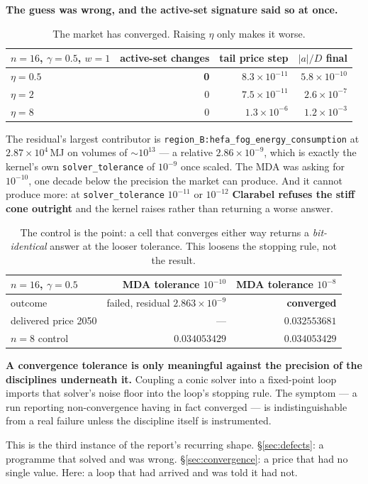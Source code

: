 \documentclass[11pt,a4paper]{article}
\newcommand{\var}[1]{\texttt{\small #1}}
\begin{document}
\textbf{The guess was wrong, and the active-set signature said so at once.}

\begin{table}[h]
\centering\small
\begin{tabular}{@{}lrrr@{}}
\toprule
$n=16$, $\gamma=0.5$, $w=1$ & active-set changes & tail price step & $|a|/D$ final \\
\midrule
$\eta = 0.5$ & \textbf{0} & $8.3\times10^{-11}$ & $5.8\times10^{-10}$ \\
$\eta = 2$   & 0 & $7.5\times10^{-11}$ & $2.6\times10^{-7}$ \\
$\eta = 8$   & 0 & $1.3\times10^{-6}$ & $1.2\times10^{-3}$ \\
\bottomrule
\end{tabular}
\caption{The market has converged. Raising $\eta$ only makes it worse.}
\end{table}

\noindent The residual's largest contributor is
\var{region\_B:hefa\_fog\_energy\_consumption} at $2.87\times10^{4}$\,MJ on volumes of
$\sim10^{13}$ --- a relative $2.86\times10^{-9}$, which is exactly the kernel's own
\var{solver\_tolerance} of $10^{-9}$ once scaled. The MDA was asking for $10^{-10}$, one
decade below the precision the market can produce. And it cannot produce more: at
\var{solver\_tolerance} $10^{-11}$ or $10^{-12}$ \textbf{Clarabel refuses the stiff cone
outright} and the kernel raises rather than returning a worse answer.

\begin{table}[h]
\centering\small
\begin{tabular}{@{}lrr@{}}
\toprule
$n=16$, $\gamma=0.5$ & MDA tolerance $10^{-10}$ & MDA tolerance $10^{-8}$ \\
\midrule
outcome & failed, residual $2.863\times10^{-9}$ & \textbf{converged} \\
delivered price 2050 & --- & $0.032553681$ \\
$n=8$ control & $0.034053429$ & $\mathbf{0.034053429}$ \\
\bottomrule
\end{tabular}
\caption{The control is the point: a cell that converges either way returns a
\emph{bit-identical} answer at the looser tolerance. This loosens the stopping rule, not
the result.}
\end{table}

\begin{keybox}
\textbf{A convergence tolerance is only meaningful against the precision of the
disciplines underneath it.} Coupling a conic solver into a fixed-point loop imports that
solver's noise floor into the loop's stopping rule. The symptom --- a run reporting
non-convergence having in fact converged --- is indistinguishable from a real failure
unless the discipline itself is instrumented.

This is the third instance of the report's recurring shape. \S\ref{sec:defects}: a
programme that solved and was wrong. \S\ref{sec:convergence}: a price that had no single
value. Here: a loop that had arrived and was told it had not.
\end{keybox}
\end{document}
